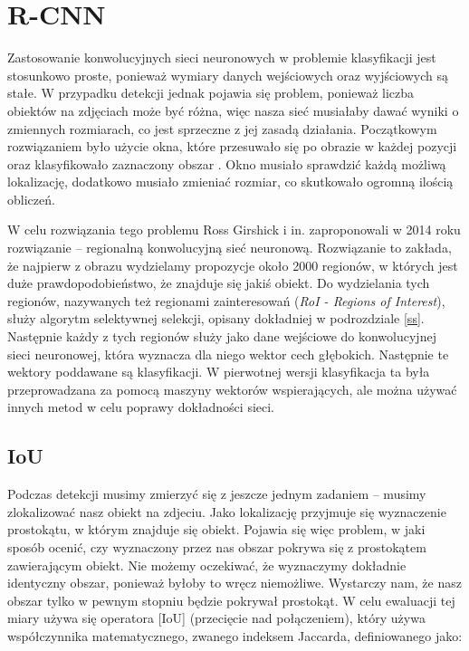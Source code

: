 \documentclass[a4paper,twoside,12pt]{book}
\newcommand{\obcy}[1]{\emph{#1}}
\newcommand{\ang}[1]{{\selectlanguage{british}\obcy{#1}}}
\begin{document}
{\section{R-CNN}
\label{rcnn}
{Zastosowanie konwolucyjnych sieci neuronowych w problemie klasyfikacji jest stosunkowo proste, ponieważ wymiary danych wejściowych oraz wyjściowych są stałe. W przypadku detekcji jednak pojawia się problem, ponieważ liczba obiektów na zdjęciach może być różna, więc nasza sieć musiałaby dawać wyniki o zmiennych rozmiarach, co jest sprzeczne z jej zasadą działania. Początkowym rozwiązaniem było użycie okna, które przesuwało się po obrazie w każdej pozycji oraz klasyfikowało zaznaczony obszar \cite{szegedy2013deep}. Okno musiało sprawdzić każdą możliwą lokalizację, dodatkowo musiało zmieniać rozmiar, co skutkowało ogromną ilością obliczeń.}

{W celu rozwiązania tego problemu Ross Girshick i in. zaproponowali w 2014 roku rozwiązanie – regionalną konwolucyjną sieć neuronową\cite{girshick2014rich}. Rozwiązanie to zakłada, że najpierw z obrazu wydzielamy propozycje około 2000 regionów, w których jest duże prawdopodobieństwo, że znajduje się jakiś obiekt. Do wydzielania tych regionów, nazywanych też regionami zainteresowań (\ang {RoI - Regions of Interest}), służy algorytm selektywnej selekcji, opisany dokładniej w podrozdziale \ref{ss}. Następnie każdy z tych regionów służy jako dane wejściowe do konwolucyjnej sieci neuronowej, która wyznacza dla niego wektor cech głębokich. Następnie te wektory poddawane są klasyfikacji. W pierwotnej wersji klasyfikacja ta była przeprowadzana za pomocą maszyny wektorów wspierających, ale można używać innych metod w celu poprawy dokładności sieci.}
\subsection{IoU}
\label{iou}
{Podczas detekcji musimy zmierzyć się z jeszcze jednym zadaniem – musimy zlokalizować nasz obiekt na zdjeciu. Jako lokalizację przyjmuje się wyznaczenie prostokątu, w którym znajduje się obiekt. Pojawia się więc problem, w jaki sposób ocenić, czy wyznaczony przez nas obszar pokrywa się z prostokątem zawierającym obiekt. Nie możemy oczekiwać, że wyznaczymy dokładnie identyczny obszar, ponieważ byłoby to wręcz niemożliwe. Wystarczy nam, że nasz obszar tylko w pewnym stopniu będzie pokrywał prostokąt. W celu ewaluacji tej miary używa się operatora [IoU] (przecięcie nad połączeniem), który używa współczynnika matematycznego, zwanego indeksem Jaccarda, definiowanego jako: 

}}
\end{document}
